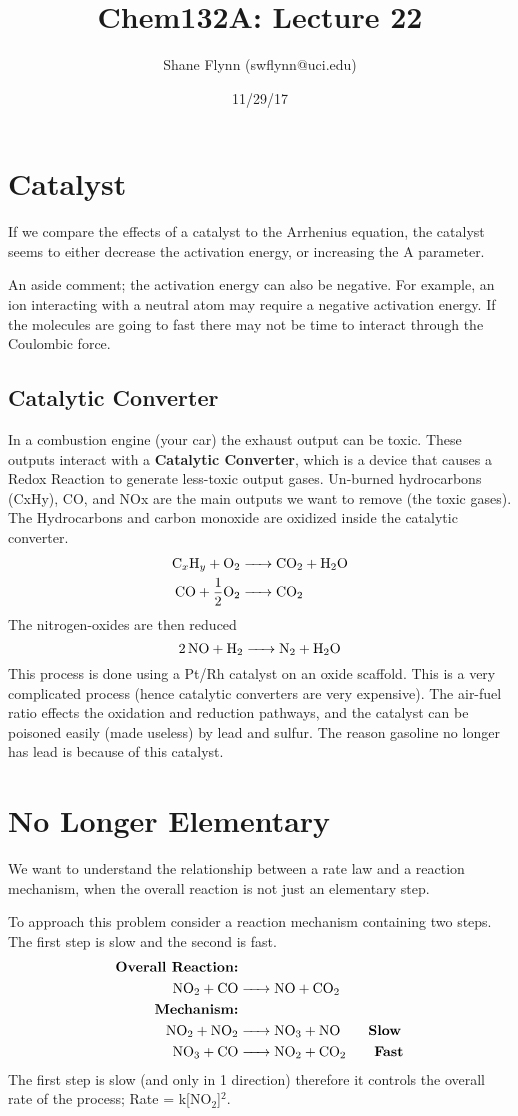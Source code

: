 \documentclass{article}
\title{Chem132A: Lecture 22}
\author{Shane Flynn (swflynn@uci.edu)}
\date{11/29/17}
\newcommand{\be}{\begin{equation}}
\newcommand{\ee}{\end{equation}}
\begin{document}
\maketitle

\section{Catalyst}
If we compare the effects of a catalyst to the Arrhenius equation, the catalyst seems to either decrease the activation energy, or increasing the A parameter. 

An aside comment; the activation energy can also be negative.
For example, an ion interacting with a neutral atom may require a  negative activation energy.
If the molecules are going to fast there may not be time to interact through the Coulombic force.

\subsection*{Catalytic Converter}
In a combustion engine (your car) the exhaust output can be toxic.
These  outputs interact with a \textbf{Catalytic Converter}, which is a device that causes a Redox Reaction to generate less-toxic output gases. 
Un-burned hydrocarbons (CxHy), CO, and NOx are the main outputs we want to remove (the toxic gases).  
The Hydrocarbons and carbon monoxide are oxidized inside the catalytic converter.
\be
\begin{split}
\ce{C_xH_y + O2 &-> CO2 + H2O}\\
\ce{CO + \frac{1}{2}O2 &-> CO2}
\end{split}
\ee
The nitrogen-oxides are then reduced
\be
\ce{2NO + H2 -> N2 + H2O}
\ee
This process is done using a Pt/Rh catalyst on an oxide scaffold.
This is a very complicated process (hence catalytic converters are very expensive).
The air-fuel ratio effects the oxidation and reduction pathways,  and the catalyst can be poisoned easily (made useless) by lead and sulfur. 
The reason gasoline no longer has lead is because of this catalyst. 
\section{No Longer Elementary}
We want to understand the relationship between a rate law and  a reaction mechanism, when the overall reaction is not just an elementary step. 

To approach this problem consider a reaction mechanism containing two steps.
The first step is slow and the second is fast. 
\be
\begin{split}
    \textbf{Overall Reaction:}&\\
    \ce{NO2 + CO &-> NO + CO2}\\
    \textbf{Mechanism:}&\\
    \ce{NO2 + NO2 &-> NO3 + NO}  \qquad \textbf{Slow}\\
    \ce{NO3 + CO &-> NO2 + CO2} \qquad \textbf{Fast}
\end{split}
\ee
The first step is slow (and only in 1 direction) therefore it controls  the overall rate of the process; Rate = k[NO$_2$]$^2$. 
\end{document}

